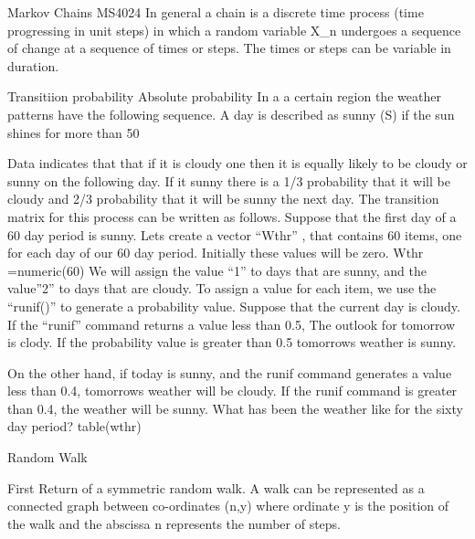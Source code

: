 Markov Chains
MS4024 In general a chain is a discrete time process (time progressing in unit steps) in which a random variable X_n undergoes a sequence of change at a sequence of times or steps. The times or steps can be variable in duration.
 
Transitiion probability
Absolute probability
In a a certain region the weather patterns have the following sequence. A day is described as sunny (S) if the sun shines for more than 50%
 
Data indicates that that if it is cloudy one then it is equally likely to be cloudy or sunny on the following day. If it sunny  there is a 1/3 probability that it will be cloudy and 2/3 probability that it will be sunny the next day.
The transition matrix for this process can be written as follows.
Suppose that the first day of a 60 day period is sunny.
Lets create a vector “Wthr” , that contains 60 items, one for each day of our 60 day period. Initially these values will be zero.
Wthr =numeric(60)
We will assign the value “1” to days that are sunny, and the value”2” to days that are cloudy.
To assign a value for each item, we use the “runif()” to generate a probability value.
Suppose that the current day is cloudy. If the “runif” command returns a value less than 0.5,  The outlook for tomorrow is clody. If the probability value is greater than 0.5 tomorrows weather is sunny.
 
On the other hand, if today is sunny, and the runif command generates a value less than 0.4, tomorrows weather will be cloudy. If the runif command is greater than 0.4, the weather will be sunny.
What has been the weather like for the sixty day period?
table(wthr)

 
Random Walk


First Return of a symmetric random walk.
A walk can be represented as  a connected graph between co-ordinates (n,y) where ordinate y is the position of the walk and the abscissa n represents the number of steps.
 
